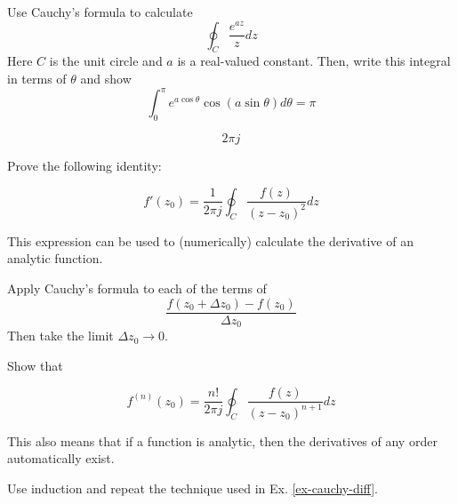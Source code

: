 \begin{exer}
Use Cauchy's formula to calculate 
$$\oint_{{C}}  \frac {e^{az}} {z} dz$$
Here ${C}$ is the unit circle and $a$ is a real-valued constant. Then, write this integral in terms of $\theta$ and show
$$ \int_0^\pi e ^{a \cos \theta} \cos (a \sin \theta) d\theta = \pi $$
\begin{sol}
$$2 \pi j$$
\end{sol}
\end{exer}

\begin{exer}
\label{ex-cauchy-diff}
Prove the following identity:

$$f'(z_0)=\frac{1}{2 \pi j} \oint_{{C}} \frac{f(z)} {(z-z_0)^2} dz$$

This expression can be used to (numerically) calculate the derivative of an analytic function.
\begin{hnt}
Apply Cauchy's formula to each of the terms of $$\frac{f(z_0+\Delta z_0) - f(z_0)}{\Delta z_0}$$ Then take the limit ${\Delta z_0} \to 0$.
\end{hnt}
\end{exer}

\begin{exer}
Show that

  $$f^{(n)}(z_0)=\frac{n!}{2 \pi j} \oint_{{C}} \frac{f(z)} {(z-z_0)^{n+1}} dz$$
  
This also means that if a function is analytic, then the derivatives of any order automatically exist.
\begin{hnt}
Use induction and repeat the technique used in Ex. \ref{ex-cauchy-diff}.
\end{hnt}  
\end{exer}


\pagebreak




